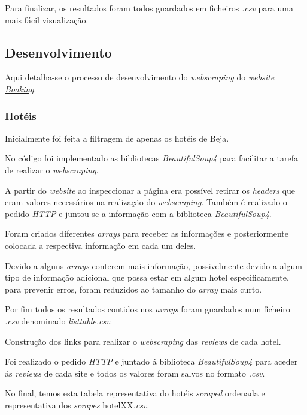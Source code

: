 Para finalizar, os resultados foram todos guardados em ficheiros \textit{.csv} para uma mais fácil visualização.

\subsection{Desenvolvimento}

Aqui detalha-se o processo de desenvolvimento do \textit{webscraping} do \textit{website} \href{https://www.booking.com/country/pt.pt-pt.html}{\textit{Booking}}.

\subsubsection{Hotéis}

Inicialmente foi feita a filtragem de apenas os hotéis de Beja.

\newpage
No código foi implementado as bibliotecas \textit{BeautifulSoup4} para facilitar a tarefa de realizar o \textit{webscraping}.

A partir do \textit{website} ao inspeccionar a página era possível retirar os \textit{headers} que eram valores necessários na realização do \textit{webscraping}.
Também é realizado o pedido \textit{HTTP} e juntou-se a informação com a biblioteca \textit{BeautifulSoup4}.

Foram criados diferentes \textit{arrays} para receber as informações e posteriormente colocada a respectiva informação em cada um deles.

Devido a alguns \textit{arrays} conterem mais informação, possivelmente devido a algum tipo de informação adicional que possa estar em algum hotel especificamente, para prevenir erros, foram reduzidos ao tamanho do \textit{array} mais curto.

Por fim todos os resultados contidos nos \textit{arrays} foram guardados num ficheiro \textit{.csv} denominado \textit{listtable.csv}.

Construção dos links para realizar o \textit{webscraping} das \textit{reviews} de cada hotel.

Foi realizado o pedido \textit{HTTP} e juntado á biblioteca \textit{BeautifulSoup4} para aceder ás \textit{reviews} de cada site e todos os valores foram salvos no formato \textit{.csv}.

No final, temos esta tabela representativa do hotéis \textit{scraped} ordenada e representativa dos \textit{scrapes} hotelXX\textit{.csv}.



